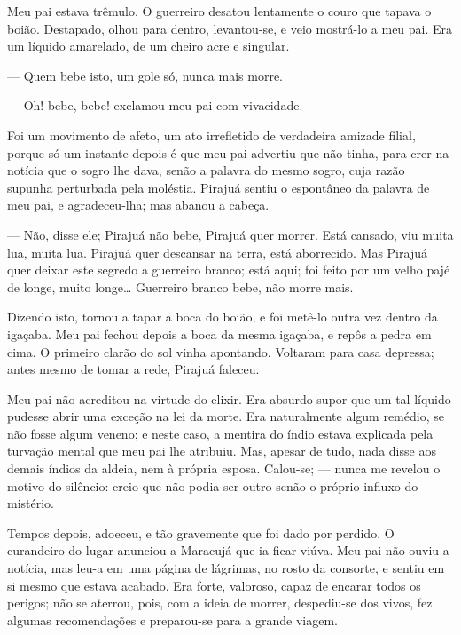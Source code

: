 Meu pai estava trêmulo. O guerreiro desatou lentamente o couro que
tapava o boião. Destapado, olhou para dentro, levantou-se, e veio
mostrá-lo a meu pai. Era um líquido amarelado, de um cheiro acre e
singular.

--- Quem bebe isto, um gole só, nunca mais morre.

--- Oh! bebe, bebe! exclamou meu pai com vivacidade.

Foi um movimento de afeto, um ato irrefletido de verdadeira amizade
filial, porque só um instante depois é que meu pai advertiu que não
tinha, para crer na notícia que o sogro lhe dava, senão a palavra do
mesmo sogro, cuja razão supunha perturbada pela moléstia. Pirajuá sentiu
o espontâneo da palavra de meu pai, e agradeceu-lha; mas abanou a
cabeça.

--- Não, disse ele; Pirajuá não bebe, Pirajuá quer morrer. Está
cansado, viu muita lua, muita lua. Pirajuá quer descansar na terra, está
aborrecido. Mas Pirajuá quer deixar este segredo a guerreiro branco;
está aqui; foi feito por um velho pajé de longe, muito longe\ldots{}
Guerreiro branco bebe, não morre mais.

Dizendo isto, tornou a tapar a boca do boião, e foi metê-lo outra vez
dentro da igaçaba. Meu pai fechou depois a boca da mesma igaçaba, e
repôs a pedra em cima. O primeiro clarão do sol vinha apontando.
Voltaram para casa depressa; antes mesmo de tomar a rede, Pirajuá
faleceu.

Meu pai não acreditou na virtude do elixir. Era absurdo supor que um tal
líquido pudesse abrir uma exceção na lei da morte. Era naturalmente
algum remédio, se não fosse algum veneno; e neste caso, a mentira do
índio estava explicada pela turvação mental que meu pai lhe atribuiu.
Mas, apesar de tudo, nada disse aos demais índios da aldeia, nem à
própria esposa. Calou-se; --- nunca me revelou o motivo do silêncio:
creio que não podia ser outro senão o próprio influxo do mistério.

Tempos depois, adoeceu, e tão gravemente que foi dado por perdido. O
curandeiro do lugar anunciou a Maracujá que ia ficar viúva. Meu pai não
ouviu a notícia, mas leu-a em uma página de lágrimas, no rosto da
consorte, e sentiu em si mesmo que estava acabado. Era forte, valoroso,
capaz de encarar todos os perigos; não se aterrou, pois, com a ideia de
morrer, despediu-se dos vivos, fez algumas recomendações e preparou-se
para a grande viagem.

